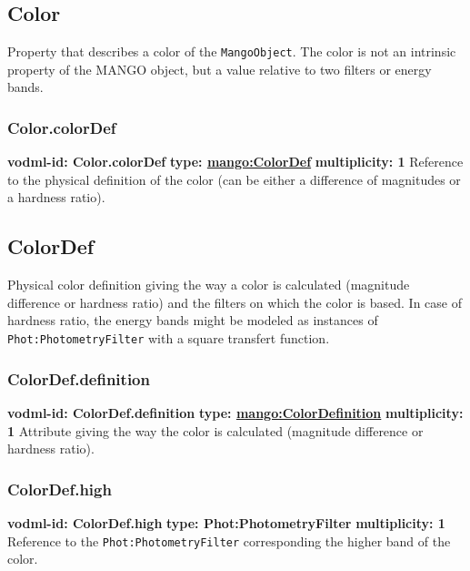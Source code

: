   \subsection{Color}
  \label{sect:Color}
    Property that describes a color of the \texttt{MangoObject}. The color is not an intrinsic property of the MANGO object, but a value relative to two filters or energy bands.

    \subsubsection{Color.colorDef}
      \textbf{vodml-id: Color.colorDef} \newline
      \textbf{type: \hyperref[sect:ColorDef]{mango:ColorDef}} \newline
      \textbf{multiplicity: 1} \newline
      Reference to the physical definition of the color (can be either a difference of magnitudes or a hardness ratio).

  \subsection{ColorDef}
  \label{sect:ColorDef}
    Physical color definition giving the way a color is calculated (magnitude difference or hardness ratio) and the filters on which the color is based. In case of hardness ratio, the energy bands might be modeled as instances of \texttt{Phot:PhotometryFilter} with a square transfert function.

    \subsubsection{ColorDef.definition}
      \textbf{vodml-id: ColorDef.definition} \newline
      \textbf{type: \hyperref[sect:ColorDefinition]{mango:ColorDefinition}} \newline
      \textbf{multiplicity: 1} \newline
      Attribute giving the way the color is calculated (magnitude difference or hardness ratio).

    \subsubsection{ColorDef.high}
      \textbf{vodml-id: ColorDef.high} \newline
      \textbf{type: Phot:PhotometryFilter} \newline
      \textbf{multiplicity: 1} \newline
      Reference to the \texttt{Phot:PhotometryFilter} \citep{2022ivoa.spec.1101S} corresponding the higher band of the color.

